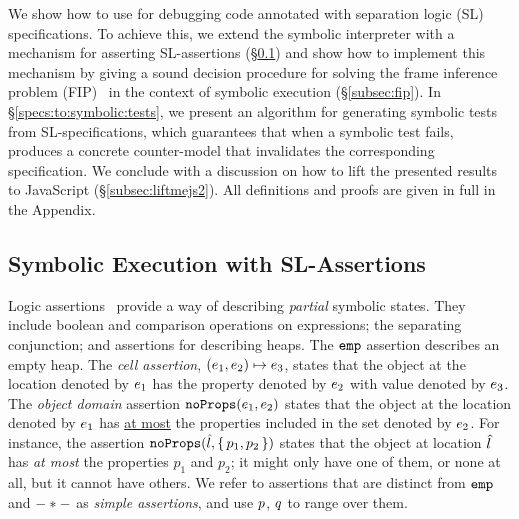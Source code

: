 


We show how to use \cosette for debugging \jsil code annotated with separation logic (SL) specifications.
To achieve this, we extend the 
 \jsil symbolic interpreter with a mechanism for asserting
SL-assertions (\S\ref{subsec:sep:assertions}) and show how to 
implement this mechanism by giving a sound decision procedure 
for solving the frame inference problem (FIP)~\cite{berdine:aplas:2005}
in the context of symbolic execution (\S\ref{subsec:fip}).
%
%
In \S\ref{specs:to:symbolic:tests}, we present an algorithm  
for generating symbolic tests from SL-specifications, which guarantees 
that when a symbolic test fails, \cosette produces a concrete 
counter-model that invalidates the corresponding specification. 
We conclude with a discussion on how to lift the presented results to JavaScript (\S\ref{subsec:liftmejs2}).
All definitions and proofs are given in full in the Appendix.

\vspace{-5pt}
\subsection{Symbolic Execution with SL-Assertions}\label{subsec:sep:assertions}

\jsil Logic assertions~\cite{javert} provide a way of describing \emph{partial} symbolic states.
They include boolean and comparison operations on \jsil expressions; the separating conjunction; 
and assertions for describing heaps. The $\texttt{emp}$ assertion describes 
an empty heap. The \emph{cell assertion}, $(e_1,e_2) \mapsto e_3$,  states that the object 
at the location denoted by $e_1$ has the property denoted by $e_2$ with value 
denoted by $e_3$. The \emph{object domain} assertion $\texttt{noProps}(e_1, e_2)$ states that the object at 
the location denoted by $e_1$ has \underline{at most} the properties included in the
set denoted by $e_2$. For instance, the assertion $\texttt{noProps}(\hat{l}, \{ \, p_1, p_2 \, \})$ 
states that the object at location $\hat{l}$ has \emph{at most} the properties $p_1$ and $p_2$; 
it might only have one of them, or none at all, but it cannot have others.
We refer to assertions that are distinct from $\texttt{emp}$ and $- \mathbin{*} -$ as \emph{simple assertions}, and use $p$, $q$ 
to range over them.

